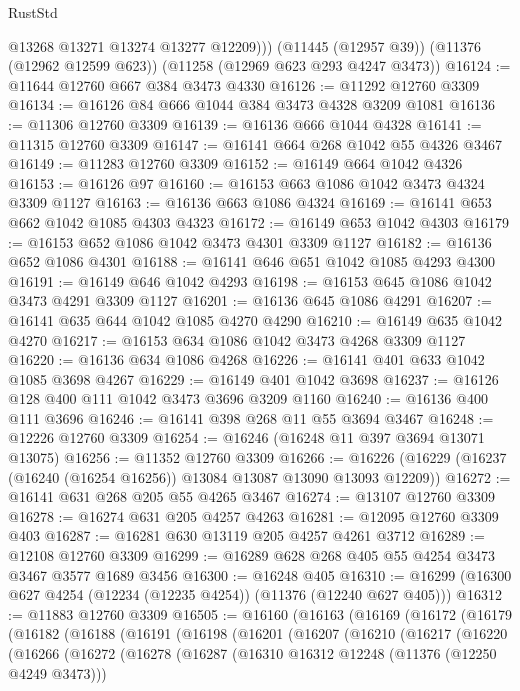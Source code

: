 \begin{lexlean}{RustStd}
\begin{coremodule}
{{{{{{{{{{{{{{{{{{{          @13268
          @13271
          @13274
          @13277
          @12209)))
    (@11445 (@12957 @39))
    (@11376 (@12962 @12599 @623))
    (@11258 (@12969 @623 @293 @4247 @3473))
@16124 := @11644 @12760 @667 @384 @3473 @4330
@16126 := @11292 @12760 @3309
@16134 := @16126 @84 @666 @1044 @384 @3473 @4328 @3209 @1081
@16136 := @11306 @12760 @3309
@16139 := @16136 @666 @1044 @4328
@16141 := @11315 @12760 @3309
@16147 := @16141 @664 @268 @1042 @55 @4326 @3467
@16149 := @11283 @12760 @3309
@16152 := @16149 @664 @1042 @4326
@16153 := @16126 @97
@16160 := @16153 @663 @1086 @1042 @3473 @4324 @3309 @1127
@16163 := @16136 @663 @1086 @4324
@16169 := @16141 @653 @662 @1042 @1085 @4303 @4323
@16172 := @16149 @653 @1042 @4303
@16179 := @16153 @652 @1086 @1042 @3473 @4301 @3309 @1127
@16182 := @16136 @652 @1086 @4301
@16188 := @16141 @646 @651 @1042 @1085 @4293 @4300
@16191 := @16149 @646 @1042 @4293
@16198 := @16153 @645 @1086 @1042 @3473 @4291 @3309 @1127
@16201 := @16136 @645 @1086 @4291
@16207 := @16141 @635 @644 @1042 @1085 @4270 @4290
@16210 := @16149 @635 @1042 @4270
@16217 := @16153 @634 @1086 @1042 @3473 @4268 @3309 @1127
@16220 := @16136 @634 @1086 @4268
@16226 := @16141 @401 @633 @1042 @1085 @3698 @4267
@16229 := @16149 @401 @1042 @3698
@16237 := @16126 @128 @400 @111 @1042 @3473 @3696 @3209 @1160
@16240 := @16136 @400 @111 @3696
@16246 := @16141 @398 @268 @11 @55 @3694 @3467
@16248 := @12226 @12760 @3309
@16254 := @16246 (@16248 @11 @397 @3694 @13071 @13075)
@16256 := @11352 @12760 @3309
@16266 := @16226 (@16229 (@16237 (@16240 (@16254 @16256)) @13084 @13087 @13090 @13093 @12209))
@16272 := @16141 @631 @268 @205 @55 @4265 @3467
@16274 := @13107 @12760 @3309
@16278 := @16274 @631 @205 @4257 @4263
@16281 := @12095 @12760 @3309 @403
@16287 := @16281 @630 @13119 @205 @4257 @4261 @3712
@16289 := @12108 @12760 @3309
@16299 := @16289 @628 @268 @405 @55 @4254 @3473 @3467 @3577 @1689 @3456
@16300 := @16248 @405
@16310 := @16299 (@16300 @627 @4254 (@12234 (@12235 @4254)) (@11376 (@12240 @627 @405)))
@16312 := @11883 @12760 @3309
@16505 := @16160
    (@16163
      (@16169
        (@16172
          (@16179
            (@16182
              (@16188
                (@16191
                  (@16198
                    (@16201
                      (@16207
                        (@16210
                          (@16217
                            (@16220
                              (@16266
                                (@16272
                                  (@16278
                                    (@16287
                                      (@16310 @16312 @12248 (@11376 (@12250 @4249 @3473)))
}}}}}}}}}}}}}}}}}}}
\end{coremodule}
\end{lexlean}
